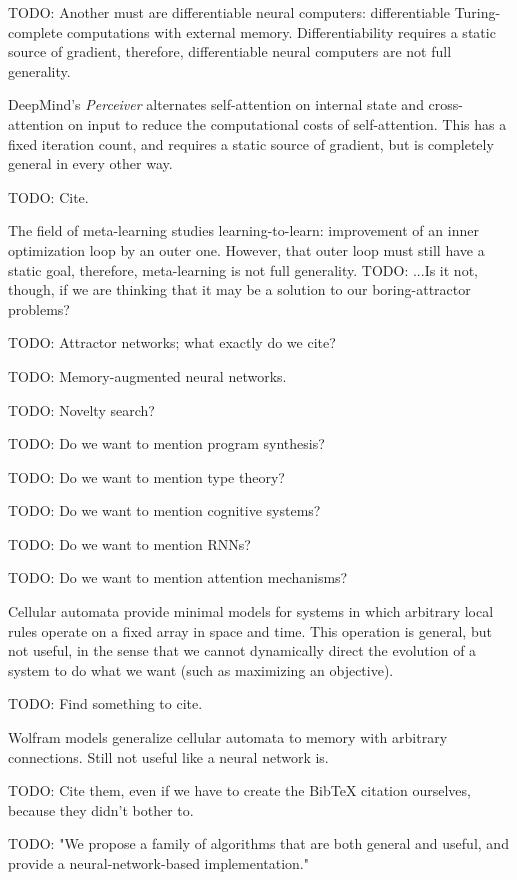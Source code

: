 \documentclass{article}
\begin{document}
    TODO: Another must are differentiable neural computers: differentiable Turing-complete computations with external memory. Differentiability requires a static source of gradient, therefore, differentiable neural computers are not full generality.

DeepMind's \textit{Perceiver} \cite{DBLP:journals/corr/abs-2103-03206} alternates self-attention on internal state and cross-attention on input to reduce the computational costs of self-attention. This has a fixed iteration count, and requires a static source of gradient, but is completely general in every other way.

    TODO: Cite.

The field of meta-learning studies learning-to-learn: improvement of an inner optimization loop by an outer one. However, that outer loop must still have a static goal, therefore, meta-learning is not full generality. TODO: ...Is it not, though, if we are thinking that it may be a solution to our boring-attractor problems?

    TODO: Attractor networks; what exactly do we cite?

    TODO: Memory-augmented neural networks.

    TODO: Novelty search?

    TODO: Do we want to mention program synthesis?

    TODO: Do we want to mention type theory?

    TODO: Do we want to mention cognitive systems?

    TODO: Do we want to mention RNNs?

    TODO: Do we want to mention attention mechanisms?

Cellular automata provide minimal models for systems in which arbitrary local rules operate on a fixed array in space and time. This operation is general, but not useful, in the sense that we cannot dynamically direct the evolution of a system to do what we want (such as maximizing an objective).

    TODO: Find something to cite.

Wolfram models generalize cellular automata to memory with arbitrary connections. Still not useful like a neural network is.

    TODO: Cite them, even if we have to create the BibTeX citation ourselves, because they didn't bother to.

    TODO: "We propose a family of algorithms that are both general and useful, and provide a neural-network-based implementation."
\end{document}
